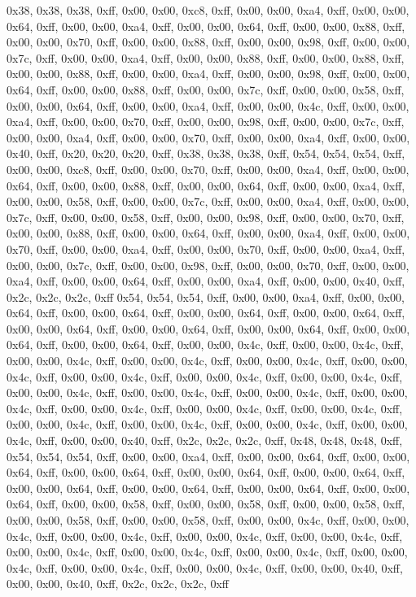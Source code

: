 0x38, 0x38, 0x38, 0xff, 0x00, 0x00, 0xc8, 0xff, 0x00, 0x00, 0xa4, 0xff, 0x00, 0x00, 0x64, 0xff, 0x00, 0x00, 0xa4, 0xff, 0x00, 0x00, 0x64, 0xff, 0x00, 0x00, 0x88, 0xff, 0x00, 0x00, 0x70, 0xff, 0x00, 0x00, 0x88, 0xff, 0x00, 0x00, 0x98, 0xff, 0x00, 0x00, 0x7c, 0xff, 0x00, 0x00, 0xa4, 0xff, 0x00, 0x00, 0x88, 0xff, 0x00, 0x00, 0x88, 0xff, 0x00, 0x00, 0x88, 0xff, 0x00, 0x00, 0xa4, 0xff, 0x00, 0x00, 0x98, 0xff, 0x00, 0x00, 0x64, 0xff, 0x00, 0x00, 0x88, 0xff, 0x00, 0x00, 0x7c, 0xff, 0x00, 0x00, 0x58, 0xff, 0x00, 0x00, 0x64, 0xff, 0x00, 0x00, 0xa4, 0xff, 0x00, 0x00, 0x4c, 0xff, 0x00, 0x00, 0xa4, 0xff, 0x00, 0x00, 0x70, 0xff, 0x00, 0x00, 0x98, 0xff, 0x00, 0x00, 0x7c, 0xff, 0x00, 0x00, 0xa4, 0xff, 0x00, 0x00, 0x70, 0xff, 0x00, 0x00, 0xa4, 0xff, 0x00, 0x00, 0x40, 0xff, 0x20, 0x20, 0x20, 0xff, 0x38, 0x38, 0x38, 0xff, 0x54, 0x54, 0x54, 0xff, 0x00, 0x00, 0xc8, 0xff, 0x00, 0x00, 0x70, 0xff, 0x00, 0x00, 0xa4, 0xff, 0x00, 0x00, 0x64, 0xff, 0x00, 0x00, 0x88, 0xff, 0x00, 0x00, 0x64, 0xff, 0x00, 0x00, 0xa4, 0xff, 0x00, 0x00, 0x58, 0xff, 0x00, 0x00, 0x7c, 0xff, 0x00, 0x00, 0xa4, 0xff, 0x00, 0x00, 0x7c, 0xff, 0x00, 0x00, 0x58, 0xff, 0x00, 0x00, 0x98, 0xff, 0x00, 0x00, 0x70, 0xff, 0x00, 0x00, 0x88, 0xff, 0x00, 0x00, 0x64, 0xff, 0x00, 0x00, 0xa4, 0xff, 0x00, 0x00, 0x70, 0xff, 0x00, 0x00, 0xa4, 0xff, 0x00, 0x00, 0x70, 0xff, 0x00, 0x00, 0xa4, 0xff, 0x00, 0x00, 0x7c, 0xff, 0x00, 0x00, 0x98, 0xff, 0x00, 0x00, 0x70, 0xff, 0x00, 0x00, 0xa4, 0xff, 0x00, 0x00, 0x64, 0xff, 0x00, 0x00, 0xa4, 0xff, 0x00, 0x00, 0x40, 0xff, 0x2c, 0x2c, 0x2c, 0xff
0x54, 0x54, 0x54, 0xff, 0x00, 0x00, 0xa4, 0xff, 0x00, 0x00, 0x64, 0xff, 0x00, 0x00, 0x64, 0xff, 0x00, 0x00, 0x64, 0xff, 0x00, 0x00, 0x64, 0xff, 0x00, 0x00, 0x64, 0xff, 0x00, 0x00, 0x64, 0xff, 0x00, 0x00, 0x64, 0xff, 0x00, 0x00, 0x64, 0xff, 0x00, 0x00, 0x64, 0xff, 0x00, 0x00, 0x4c, 0xff, 0x00, 0x00, 0x4c, 0xff, 0x00, 0x00, 0x4c, 0xff, 0x00, 0x00, 0x4c, 0xff, 0x00, 0x00, 0x4c, 0xff, 0x00, 0x00, 0x4c, 0xff, 0x00, 0x00, 0x4c, 0xff, 0x00, 0x00, 0x4c, 0xff, 0x00, 0x00, 0x4c, 0xff, 0x00, 0x00, 0x4c, 0xff, 0x00, 0x00, 0x4c, 0xff, 0x00, 0x00, 0x4c, 0xff, 0x00, 0x00, 0x4c, 0xff, 0x00, 0x00, 0x4c, 0xff, 0x00, 0x00, 0x4c, 0xff, 0x00, 0x00, 0x4c, 0xff, 0x00, 0x00, 0x4c, 0xff, 0x00, 0x00, 0x4c, 0xff, 0x00, 0x00, 0x4c, 0xff, 0x00, 0x00, 0x4c, 0xff, 0x00, 0x00, 0x40, 0xff, 0x2c, 0x2c, 0x2c, 0xff, 0x48, 0x48, 0x48, 0xff, 0x54, 0x54, 0x54, 0xff, 0x00, 0x00, 0xa4, 0xff, 0x00, 0x00, 0x64, 0xff, 0x00, 0x00, 0x64, 0xff, 0x00, 0x00, 0x64, 0xff, 0x00, 0x00, 0x64, 0xff, 0x00, 0x00, 0x64, 0xff, 0x00, 0x00, 0x64, 0xff, 0x00, 0x00, 0x64, 0xff, 0x00, 0x00, 0x64, 0xff, 0x00, 0x00, 0x64, 0xff, 0x00, 0x00, 0x58, 0xff, 0x00, 0x00, 0x58, 0xff, 0x00, 0x00, 0x58, 0xff, 0x00, 0x00, 0x58, 0xff, 0x00, 0x00, 0x58, 0xff, 0x00, 0x00, 0x4c, 0xff, 0x00, 0x00, 0x4c, 0xff, 0x00, 0x00, 0x4c, 0xff, 0x00, 0x00, 0x4c, 0xff, 0x00, 0x00, 0x4c, 0xff, 0x00, 0x00, 0x4c, 0xff, 0x00, 0x00, 0x4c, 0xff, 0x00, 0x00, 0x4c, 0xff, 0x00, 0x00, 0x4c, 0xff, 0x00, 0x00, 0x4c, 0xff, 0x00, 0x00, 0x4c, 0xff, 0x00, 0x00, 0x40, 0xff, 0x00, 0x00, 0x40, 0xff, 0x2c, 0x2c, 0x2c, 0xff
